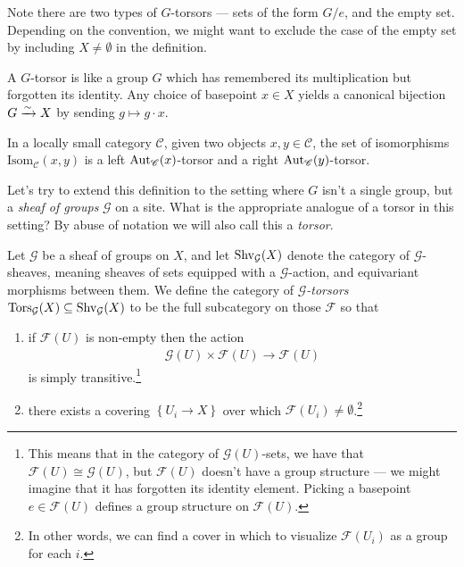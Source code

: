 \documentclass[11pt,openany]{book}
\begin{document}
Note there are two types of $G$-torsors --- sets of the form $G/e$, and the empty set. Depending on the convention, we might want to exclude the case of the empty set by including $X \ne \emptyset$ in the definition.

\begin{intuition} A $G$-torsor is like a group $G$ which has remembered its multiplication but forgotten its identity. Any choice of basepoint $x\in X$ yields a canonical bijection $G \xrightarrow{\sim} X$ by sending $g \mapsto g\cdot x$.
\end{intuition}

\begin{example} In a locally small category $\mathscr{C}$, given two objects $x,y \in \mathscr{C}$, the set of isomorphisms $\mathrm{Isom}_{\mathscr{C}}(x , y)$ is a left $\mathrm{Aut}_{\mathscr{C}}(x)$-torsor and a right $\mathrm{Aut}_{\mathscr{C}}(y)$-torsor.
\end{example}


Let's try to extend this definition to the setting where $G$ isn't a single group, but a \textit{sheaf of groups} $\mathcal{G}$ on a site. What is the appropriate analogue of a torsor in this setting? By abuse of notation we will also call this a \textit{torsor}.

\begin{definition}\label{def:torsor} 
\cite[03AH]{Stacks} Let $\mathcal{G}$ be a sheaf of groups on $X$, and let $\mathrm{Shv}_\mathcal{G}(X)$ denote the category of $\mathcal{G}$-sheaves, meaning sheaves of sets equipped with a $\mathcal{G}$-action, and equivariant morphisms between them. We define the category of $\mathcal{G}$\textit{-torsors} $\mathrm{Tors}_\mathcal{G}(X) \subseteq \mathrm{Shv}_\mathcal{G}(X)$ to be the full subcategory on those $\mathcal{F}$ so that
\begin{enumerate}
    \item if $\mathcal{F}(U)$ is non-empty then the action
    \begin{align*}
        \mathcal{G}(U) \times \mathcal{F}(U) \to \mathcal{F}(U)
    \end{align*}
    is simply transitive.\footnote{This means that in the category of $\mathcal{G}(U)$-sets, we have that $\mathcal{F}(U) \cong \mathcal{G}(U)$, but $\mathcal{F}(U)$ doesn't have a group structure --- we might imagine that it has forgotten its identity element. Picking a basepoint $e\in \mathcal{F}(U)$ defines a group structure on $\mathcal{F}(U)$.} 
    
    \item there exists a covering $\left\{ U_i \to X \right\}$ over which $\mathcal{F}(U_i) \ne \emptyset$.\footnote{In other words, we can find a cover in which to visualize $\mathcal{F}(U_i)$ as a group for each $i$.}
\end{enumerate}
\end{definition}
\end{document}

